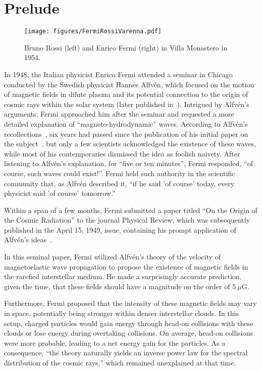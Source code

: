 \section{Prelude}
\label{sec:prelude}

\begin{figure}[t]
\centering
\texttt{[image: figures/FermiRossiVarenna.pdf]}
\caption{Bruno Rossi (left) and Enrico Fermi (right) in Villa Monastero in 1954.}
\label{fig:rossifermi}
\end{figure}

In 1948, the Italian physicist Enrico Fermi attended a seminar in Chicago conducted by the Swedish physicist Hannes Alfvén, which focused on the motion of magnetic fields in dilute plasma and its potential connection to the origin of cosmic rays within the solar system (later published in~\cite{Alfven1949pr}).
%
Intrigued by Alfvén's arguments, Fermi approached him after the seminar and requested a more detailed explanation of ``magneto-hydrodynamic'' waves. According to Alfvén's recollections~\cite{Alfven1988amsci}, six years had passed since the publication of his initial paper on the subject~\cite{Alfven1942nat}, but only a few scientists acknowledged the existence of these waves, while most of his contemporaries dismissed the idea as foolish naivety.
%
After listening to Alfvén's explanation, for ``five or ten minutes'', Fermi responded, ``of course, such waves could exist!''. 
%
Fermi held such authority in the scientific community that, as Alfvén described it, ``if he said 'of course' today, every physicist said 'of course' tomorrow.''

Within a span of a few months, Fermi submitted a paper titled ``On the Origin of the Cosmic Radiation'' to the journal Physical Review, which was subsequently published in the April 15, 1949, issue, containing his prompt application of Alfvén's ideas~\cite{Fermi1949pr}.

In this seminal paper, Fermi utilized Alfvén's theory of the velocity of magnetoelastic wave propagation to propose the existence of magnetic fields in the rarefied interstellar medium. He made a surprisingly accurate prediction, given the time, that these fields should have a magnitude on the order of $5~\mu$G.

Furthermore, Fermi proposed that the intensity of these magnetic fields may vary in space, potentially being stronger within denser interstellar clouds. In this setup, charged particles would gain energy through head-on collisions with these clouds or lose energy during overtaking collisions. On average, head-on collisions were more probable, leading to a net energy gain for the particles.
%
As a consequence, ``the theory naturally yields an inverse power law for the spectral distribution of the cosmic rays,'' which remained unexplained at that time.

